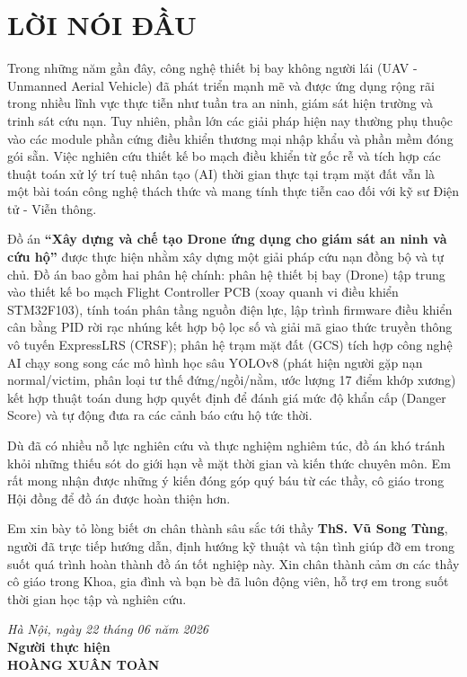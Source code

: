 \section*{LỜI NÓI ĐẦU}
\thispagestyle{empty}

Trong những năm gần đây, công nghệ thiết bị bay không người lái (UAV - \mbox{Unmanned} Aerial Vehicle) đã phát triển mạnh mẽ và được ứng dụng rộng rãi trong nhiều lĩnh vực thực tiễn như tuần tra an ninh, giám sát hiện trường và trinh sát cứu nạn. Tuy nhiên, phần lớn các giải pháp hiện nay thường phụ thuộc vào các module phần cứng điều khiển thương mại nhập khẩu và phần mềm đóng gói sẵn. Việc nghiên cứu thiết kế bo mạch điều khiển từ gốc rễ và tích hợp các thuật toán xử lý trí tuệ nhân tạo (AI) thời gian thực tại trạm mặt đất vẫn là một bài toán công nghệ thách thức và mang tính thực tiễn cao đối với kỹ sư Điện tử - Viễn thông.

Đồ án \textbf{``Xây dựng và chế tạo Drone ứng dụng cho giám sát an ninh và cứu hộ''} được thực hiện nhằm xây dựng một giải pháp cứu nạn đồng bộ và tự chủ. Đồ án bao gồm hai phân hệ chính: phân hệ thiết bị bay (Drone) tập trung vào thiết kế bo mạch Flight Controller PCB (xoay quanh vi điều khiển STM32F103), tính toán phân tầng nguồn điện lực, lập trình firmware điều khiển cân bằng PID rời rạc nhúng kết hợp bộ lọc số và giải mã giao thức truyền thông vô tuyến ExpressLRS (CRSF); phân hệ trạm mặt đất (GCS) tích hợp công nghệ AI chạy song song các mô hình học sâu YOLOv8 (phát hiện người gặp nạn normal/victim, phân loại tư thế đứng/ngồi/nằm, ước lượng 17 điểm khớp xương) kết hợp thuật toán dung hợp quyết định để đánh giá mức độ khẩn cấp (Danger Score) và tự động đưa ra các cảnh báo cứu hộ tức thời.

Dù đã có nhiều nỗ lực nghiên cứu và thực nghiệm nghiêm túc, đồ án khó tránh khỏi những thiếu sót do giới hạn về mặt thời gian và kiến thức chuyên môn. Em rất mong nhận được những ý kiến đóng góp quý báu từ các thầy, cô giáo trong Hội đồng để đồ án được hoàn thiện hơn.

Em xin bày tỏ lòng biết ơn chân thành sâu sắc tới thầy \textbf{ThS. Vũ Song Tùng}, người đã trực tiếp hướng dẫn, định hướng kỹ thuật và tận tình giúp đỡ em trong suốt quá trình hoàn thành đồ án tốt nghiệp này. Xin chân thành cảm ơn các thầy cô giáo trong Khoa, gia đình và bạn bè đã luôn động viên, hỗ trợ em trong suốt thời gian học tập và nghiên cứu.

\vspace{0.5cm}
\hfill
\begin{minipage}{0.5\textwidth}
    \centering
    \textit{Hà Nội, ngày 22 tháng 06 năm 2026} \\
    \vspace{0.2cm}
    \textbf{Người thực hiện} \\
    \vspace{2cm}
    \textbf{HOÀNG XUÂN TOÀN}
\end{minipage}
\cleardoublepage
